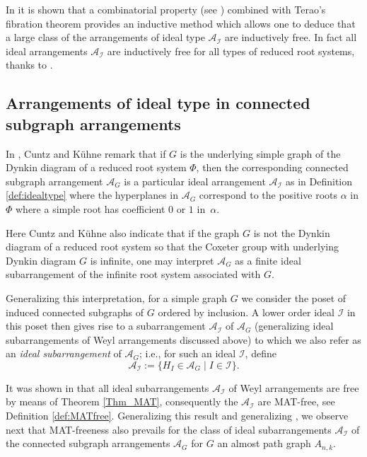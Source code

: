 \documentclass[12pt]{amsart}
\newcommand\CA{{\mathscr A}}
\newcommand\CI{{\mathcal I}}
\numberwithin{equation}{section}
\theoremstyle{plain}
\theoremstyle{definition}
\begin{document}
In \cite{roehrle:ideal} it is shown that a combinatorial property (see 
\cite[Cond.\ 1.10]{roehrle:ideal})
combined with Terao's fibration theorem \cite{terao:modular}
provides an inductive method which allows one to deduce that a large class of
the arrangements of ideal type $\CA_\CI$
are inductively free.
In fact all ideal arrangements
$\CA_\CI$ are inductively free for all types of reduced root systems, thanks to 
\cite[Thm.~1.4]{cuntzroehrleschauenburg:ideal}.


\subsection{Arrangements of ideal type in connected subgraph arrangements}
\label{sec:ideal}

In \cite[Ex.~1.4]{cuntzkuehne:subgraphs}, Cuntz and K\"uhne remark that if $G$ is the underlying simple graph of the Dynkin diagram of a reduced root system $\Phi$, then the corresponding connected subgraph arrangement $\CA_G$ is a particular ideal arrangement $\CA_\CI$ as in Definition \ref{def:idealtype} where the hyperplanes in $\CA_G$ correspond to the positive roots $\alpha$ in $\Phi$ 
where a simple root has coefficient $0$ or $1$ in~$\alpha$.

Here Cuntz and K\"uhne also indicate that if the graph $G$ is not the Dynkin diagram of a reduced root system so that the Coxeter group with underlying Dynkin diagram $G$ is infinite, one may  
interpret $\CA_G$ as a finite ideal subarrangement 
of the infinite root system associated with $G$.

Generalizing this interpretation, 
for a simple graph $G$ we consider the poset of induced connected subgraphs of $G$ ordered by inclusion. A lower order ideal $\CI$ in this poset then gives rise to a subarrangement $\CA_\CI$ of 
$\CA_G$ (generalizing ideal subarrangements of Weyl arrangements discussed above) to which we also refer as an 
\emph{ideal subarrangement}  of $\CA_G$; i.e., for such an ideal $\CI$, define 
\[
\CA_\CI := \{H_I \in \CA_G \mid I \in \CI \}.
\]

It was shown in \cite[Thm.~1.1]{abeetall:weyl} that all ideal subarrangements $\CA_\CI$ of Weyl arrangements are free by means of Theorem \ref{Thm_MAT}, consequently the $\CA_\CI$ are MAT-free, see Definition \ref{def:MATfree}. 
Generalizing this result and generalizing \cite[Thm.~4.1]{cuntzkuehne:subgraphs}, 
we observe next that MAT-freeness also prevails for the class of ideal subarrangements $\CA_\CI$ of the connected subgraph arrangements $\CA_G$ for $G$ an almost path graph $A_{n,k}$.
\end{document}
